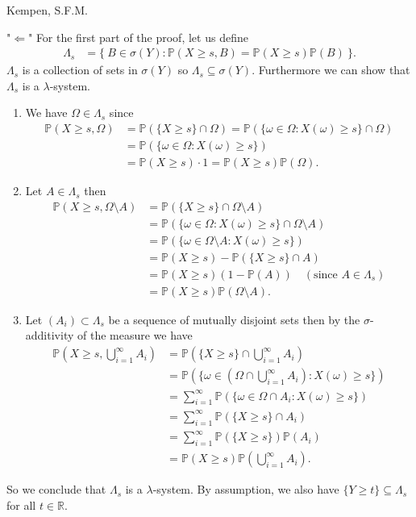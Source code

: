 \begin{solution}[5.3]{Kempen, S.F.M.}
    
    \noindent "$\Leftarrow$" For the first part of the proof, let us define
    \begin{align*}
        \Lambda_s &= \{ \ B\in \sigma(Y): \mathbb{P}(X\geq s, B) = \mathbb{P}(X\geq s)\mathbb{P}(B)\ \}.
    \end{align*}
    $\Lambda_s$ is a collection of sets in $\sigma(Y)$ so $\Lambda_s \subseteq \sigma(Y)$. Furthermore we can show that $\Lambda_s$ is a $\lambda$-system.
    \begin{enumerate}
        \item We have $\Omega \in \Lambda_s$ since 
        \begin{align*}
            \mathbb{P}(X\geq s, \Omega) &= \mathbb{P}(\{X\geq s\} \cap \Omega) = \mathbb{P}(\{\omega\in \Omega: X(\omega) \geq s\}\cap \Omega) \\
            &= \mathbb{P}(\{\omega\in \Omega: X(\omega) \geq s\}) \\
            &= \mathbb{P}(X\geq s) \cdot 1 = \mathbb{P}(X\geq s)\mathbb{P}(\Omega).
        \end{align*}
        \item Let $A \in \Lambda_s$ then 
        \begin{align*}
            \mathbb{P}(X\geq s, \Omega\setminus A) &= \mathbb{P}(\{X\geq s\} \cap \Omega\setminus A) \\
            &= \mathbb{P}(\{\omega\in \Omega: X(\omega)\geq s\} \cap \Omega\setminus A)\\
            &= \mathbb{P}(\{\omega\in \Omega\setminus A: X(\omega)\geq s\})\\
            &= \mathbb{P}(X\geq s) - \mathbb{P}(\{X\geq s\} \cap A)\\
            &= \mathbb{P}(X\geq s)(1-\mathbb{P}(A)) \quad (\textrm{since }A\in\Lambda_s)\\
            &= \mathbb{P}(X\geq s)\mathbb{P}(\Omega\setminus A). 
        \end{align*}
        \item Let $(A_i) \subset \Lambda_s$ be a sequence of mutually disjoint sets then by  the $\sigma$-additivity of the measure we have
        \begin{align*}
            \mathbb{P}(X\geq s, \bigcup_{i=1}^\infty A_i) &= \mathbb{P}(\{X\geq s\}\cap \bigcup_{i=1}^\infty A_i)\\
            &= \mathbb{P}(\{\omega\in \left(\Omega\cap \bigcup_{i=1}^\infty A_i\right): X(\omega)\geq s\} )\\
            &= \sum_{i=1}^\infty \mathbb{P}( \{\omega\in \Omega\cap A_i: X(\omega)\geq s\} )\\
            &= \sum_{i=1}^\infty \mathbb{P}(\{X\geq s\} \cap A_i)\\
            &= \sum_{i=1}^\infty \mathbb{P}(\{X\geq s\}) \mathbb{P}(A_i)\\
            &= \mathbb{P}(X\geq s) \mathbb{P}(\bigcup_{i=1}^\infty A_i).
        \end{align*}
    \end{enumerate}
    So we conclude that $\Lambda_s$ is a $\lambda$-system. By assumption, we also have $\{Y\geq t\}\subseteq \Lambda_s$ for all $t\in \mathbb{R}$.
    

\end{solution}
